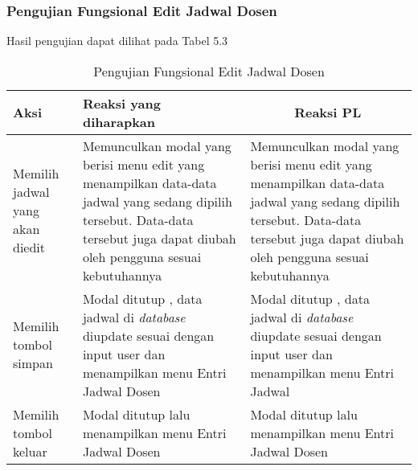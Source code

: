 \subsubsection{Pengujian Fungsional Edit Jadwal Dosen}
Hasil pengujian dapat dilihat pada Tabel 5.3
\begin{center}
	\begin{table}[H]
		\caption{Pengujian Fungsional Edit Jadwal Dosen}
		\begin{tabular}{|p{5cm}|p{5cm}|p{5cm}|}
		\hline
		\centering Aksi	& 	\centering Reaksi yang diharapkan &  \multicolumn{1}{c|}{Reaksi PL} \\
		\hline
		Memilih jadwal yang akan diedit & Memunculkan modal yang berisi menu edit yang menampilkan data-data jadwal yang sedang dipilih tersebut. Data-data tersebut juga dapat diubah oleh pengguna sesuai kebutuhannya & Memunculkan modal yang berisi menu edit yang menampilkan data-data jadwal yang sedang dipilih tersebut. Data-data tersebut juga dapat diubah oleh pengguna sesuai kebutuhannya \\
		\hline
		Memilih tombol simpan & Modal ditutup , data jadwal di \textit{database} diupdate sesuai dengan input user dan menampilkan menu Entri Jadwal Dosen & Modal ditutup , data jadwal di \textit{database} diupdate sesuai dengan input user dan menampilkan menu Entri Jadwal \\
		\hline
		Memilih tombol keluar & Modal ditutup lalu menampilkan menu Entri Jadwal Dosen & Modal ditutup lalu menampilkan menu Entri Jadwal Dosen \\
		\hline
		\end{tabular}
	\end{table}
\end{center}

